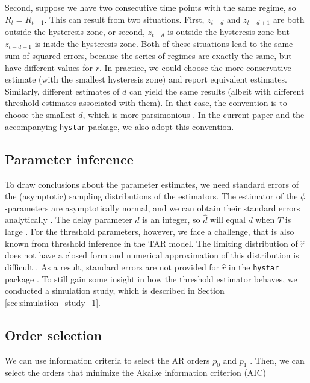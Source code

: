 \documentclass{article}
\begin{document}
Second, suppose we have two consecutive time points with the same regime, so $R_t = R_{t+1}$. This can result from two situations. First, $z_{t - d}$ and $z_{t - d + 1}$ are both outside the hysteresis zone, or second, $z_{t - d}$ is outside the hysteresis zone but $z_{t - d + 1}$ is inside the hysteresis zone. Both of these situations lead to the same sum of squared errors, because the series of regimes are exactly the same, but have different values for $r$.
In practice, we could choose the more conservative estimate (with the smallest hysteresis zone) and report equivalent estimates. Similarly, different estimates of $d$ can yield the same results (albeit with different threshold estimates associated with them). 
In that case, the convention is to choose the smallest $d$, which is more parsimonious \citep{bar2}. In the current paper and the accompanying \texttt{hystar}-package, we also adopt this convention.

\subsection{Parameter inference}
To draw conclusions about the parameter estimates, we need standard errors of the (asymptotic) sampling distributions of the estimators.
The estimator of the $\phi$-parameters are asymptotically normal, and we can obtain their standard errors analytically \citep{bar2}.
The delay parameter $d$ is an integer, so $\hat{d}$ will equal $d$ when $T$ is large \citep{bar2}.
For the threshold parameters, however, we face a challenge, that is also known from threshold inference in the TAR model. 
The limiting distribution of $\hat{r}$ does not have a closed form and numerical approximation of this distribution is difficult \citep{bar2, li_least_2012}.
As a result, standard errors are not provided for $\hat{r}$ in the \texttt{hystar} package \citep[these are also not provided for the \texttt{mTAR}-function to estimate the standard TAR model in the \textsf{R}-package \texttt{NTS},][]{R_NTS}. 
To still gain some insight in how the threshold estimator behaves, we conducted a simulation study, which is described in Section \ref{sec:simulation_study_1}.

\subsection{Order selection}
\label{sec:selecting_AR_orders}
We can use information criteria to select the AR orders $p_0$ and $p_1$ \citep[see][for an overview of information criteria in the context of threshold models]{information_criteria_tar}. 
Then, we can select the orders that minimize the Akaike information criterion (AIC)
\end{document}
